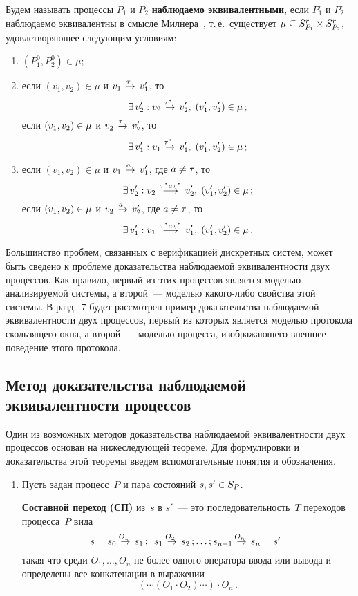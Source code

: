 \begin{multicols}{2}
Будем называть процессы $P_1$ и $P_2$ {\bf наблюдаемо эквивалентными}, если
$P^r_1$ и $P^r_2$ наблюдаемо эквивалентны в смысле Милнера~\cite{1-mir},
т.\,е.\ существует $\mu\hm\subseteq S_{P_1}^r \hm\times S_{P_2}^r$,
удовлетворяющее следующим условиям:
\begin{enumerate}[($i$)]
\item $(P_1^0, P_2^0)\in \mu$;
\item  если $(v_1, v_2)\in \mu$ и
$v_1\;\mathop{\to}\limits^{\!\!\!\tau}\;v'_1$, то
$$
\exists\,v'_2: v_2\;\mathop{\to}\limits^{\!\!\!\tau^*}\;v'_2,\;
(v'_1, v'_2)\in \mu\,;
$$
если $(v_1, v_2)\hm\in \mu$ и $v_2\;\mathop{\to}\limits^{\!\!\!\tau}\;v'_2$,
то
$$
\exists\,v'_1: v_1\ra{\tau^*}v'_1,\; (v'_1, v'_2)\hm\in \mu\,;
$$
\item  если $(v_1, v_2)\in \mu$ и $v_1\;\mathop{\to}\limits^{\!\!\!a}\;v'_1$,
где $a\hm\neq \tau$, то
$$
\exists\,v'_2: v_2\;\mathop{\longrightarrow}\limits^{\tau^*a\tau^*}\;v'_2,\;
(v'_1, v'_2)\in \mu\,;
$$
если $(v_1, v_2)\hm\in \mu$ и $v_2\;\mathop{\to}\limits^{\!\!\!a}\;v'_2$,
где $a\hm\neq \tau$, то
$$
\exists\,v'_1: v_1\;\mathop{\longrightarrow}\limits^{\tau^*a\tau^*}\;v'_1,\;
(v'_1, v'_2)\in \mu\,.
$$

\end{enumerate}

Большинство проблем, связанных с верификацией дискретных систем,
может быть сведено к проблеме доказательства наблюдаемой эквивалентности двух процессов.
Как правило, первый из этих процессов является моделью анализируемой системы,
а второй~--- моделью ка\-ко\-го-ли\-бо свойства
этой системы. В разд.~7 будет рассмотрен пример доказательства
наблюдаемой эквивалентности двух процессов, первый из которых является моделью протокола
скользящего окна, а второй~--- моделью процесса, изображающего внешнее поведение
этого протокола.

\subsection{Метод доказательства наблюдаемой
эквивалентности процессов}

Один из возможных методов доказательства
наблюда\-емой эквивалентности двух процессов
основан на нижеследующей теореме.
Для формулировки и доказательства
этой теоремы  введем вспомогательные понятия  и обозначения.
\begin{enumerate}[1.]
\item  Пусть задан процесс~$P$ и пара состояний
$s,s'\hm\in S_P$.

{\bf Составной переход (СП)} из~$s$ в $s'$~--- это последовательность~$T$
переходов процесса~$P$ вида
\begin{equation}
\hspace*{-3mm}s=s_0\ra{O_1}s_1\,;\enskip
s_1\ra{O_2}s_2\,;\ldots ;
s_{n-1}\ra{O_n}s_n=s' \!\!
\label{l7}
\end{equation}
такая что среди $O_1,\ldots, O_n$ не более одного
оператора ввода или вывода и
определены все конкатенации в выражении
\begin{equation}
\label{sdsdfsdfs444}
(\cdots(O_1\cdot O_2)\cdots)\cdot O_n\,.
\end{equation}


\end{enumerate}
\end{multicols}
